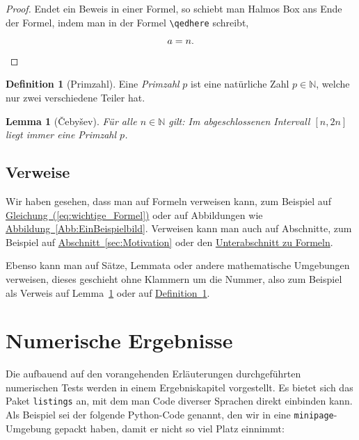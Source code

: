 \documentclass[12pt]{article}
\newtheorem{lemma}[theorem]{Lemma}
\theoremstyle{definition}
\newtheorem{definition}[theorem]{Definition}
\numberwithin{equation}{section}
\newcommand{\N}{\mathbb{N}}
\begin{document}
\begin{proof}
  Endet ein Beweis in einer Formel, so schiebt man Halmos Box ans Ende
  der Formel, indem man in der Formel \verb|\qedhere| schreibt,
  \[
    a = n. \qedhere
  \]
\end{proof}

\begin{definition}[Primzahl]
  \label{def:Primzahl}
  Eine \emph{Primzahl} $p$ ist eine natürliche Zahl $p\in\N$, welche
  nur zwei verschiedene Teiler hat.
\end{definition}

\begin{lemma}[\v{C}eby\v{s}ev]
  \label{lem:Chebyshev}
  Für alle $n\in\N$ gilt: Im abgeschlossenen Intervall $[n,2n]$ liegt
  immer eine Primzahl $p$.
\end{lemma}

\subsection{Verweise}
\label{sec:Verweise}

Wir haben gesehen, dass man auf Formeln verweisen kann, zum Beispiel
auf
\hyperref[eq:wichtige_Formel]{Gleichung~(\ref*{eq:wichtige_Formel})}
oder auf Abbildungen wie
\hyperref[Abb:EinBeispielbild]{Abbildung~\ref*{Abb:EinBeispielbild}}.
Verweisen kann man auch auf Abschnitte, zum Beispiel auf
\hyperref[sec:Motivation]{Abschnitt~\ref*{sec:Motivation}} oder den
\hyperref[sec:Formeln]{Unterabschnitt zu Formeln}.

Ebenso kann man auf Sätze, Lemmata oder andere mathematische
Umgebungen verweisen, dieses geschieht ohne Klammern um die Nummer,
also zum Beispiel als Verweis auf Lemma~\ref{lem:Chebyshev} oder auf
\hyperref[def:Primzahl]{Definition~\ref*{def:Primzahl}}.

\section{Numerische Ergebnisse}
\label{sec:NumerischeErgebnisse}

Die aufbauend auf den vorangehenden Erläuterungen durchgeführten
numerischen Tests werden in einem Ergebniskapitel vorgestellt. Es
bietet sich das Paket \texttt{listings} an, mit dem man Code diverser
Sprachen direkt einbinden kann. Als Beispiel sei der folgende
Python-Code genannt, den wir in eine \texttt{minipage}-Umgebung
gepackt haben, damit er nicht so viel Platz einnimmt:
\begin{center}
  \begin{minipage}[h]{.7\linewidth}
    
  \end{minipage}
\end{center}
\end{document}

